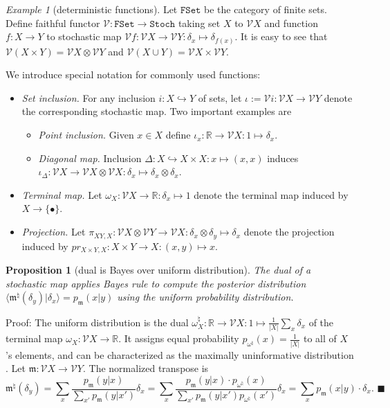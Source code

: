 \documentclass[12pt]{article}
\newcommand{\vecify}{{\mathcal V}}
\newcommand{\scat}{{\mathtt{Stoch}}}
\newcommand{\bra}{{\langle}}
\newcommand{\ket}{{\rangle}}
\newcommand{\bR}{{\mathbb R}}
\newcommand{\fm}{{\mathfrak m}}
\newtheorem{prop}[thm]{Proposition}
\theoremstyle{remark}
\newtheorem{eg}{Example}
\begin{document}
\begin{eg}[deterministic functions]
    \label{eg:det}
	Let $\mathtt{FSet}$ be the category of finite sets. Define faithful 
    functor $\vecify:\mathtt{FSet}\rightarrow \scat$ taking set $X$ to 
    $\vecify X$ and function $f:X\rightarrow Y$ to stochastic map 
    $\vecify f:\vecify X\rightarrow \vecify Y:\delta_x\mapsto 
    \delta_{f(x)}$. It is easy to see that $\vecify(X\times Y)=\vecify 
    X\otimes \vecify Y$ and $\vecify (X\cup Y)=\vecify X\times \vecify Y$.

We introduce special notation for commonly used functions:
\begin{itemize}
	\item \emph{Set inclusion.} 
	For any inclusion $i:X\hookrightarrow Y$ of sets, let $\iota:=\vecify 
    i:\vecify X\rightarrow \vecify Y$ denote the corresponding stochastic 
    map. Two important examples are
	\begin{itemize}
		\item \emph{Point inclusion.} 
		Given $x\in X$ define $\iota_x:\bR\rightarrow \vecify X:1\mapsto 
        \delta_x$.
		\item \emph{Diagonal map.} 
		Inclusion $\Delta:X\hookrightarrow X\times X:x\mapsto(x,x)$ 
        induces $\iota_\Delta:\vecify X\rightarrow \vecify X\otimes 
        \vecify X:\delta_x\mapsto \delta_x\otimes \delta_x$.		
	\end{itemize}
	\item \emph{Terminal map.}
	Let $\omega_X:\vecify X\rightarrow \bR:\delta_x\mapsto 1$ denote the 
    terminal map induced by $X\rightarrow\{\bullet\}$.
	\item \emph{Projection.}
	Let $\pi_{XY,X}:\vecify X\otimes \vecify Y\rightarrow \vecify 
    X:\delta_x\otimes \delta_y\mapsto \delta_x$ denote the projection 
    induced by $pr_{X\times Y,X}:X\times Y\rightarrow X:(x,y)\mapsto x$.
\end{itemize}
\end{eg}

\begin{prop}
	[dual is Bayes over uniform distribution]
	\label{t:dual}
	The dual of a stochastic map applies Bayes rule to compute the 
    posterior distribution $\bra \fm^\natural(\delta_y)|\delta_x\ket=
    p_\fm(x|y)$ using the uniform probability distribution.
\end{prop}

\noindent
Proof: 
The uniform distribution is the dual $\omega_X^\natural:
\bR\rightarrow\vecify X:1\mapsto \frac{1}{|X|}\sum_x \delta_x$ 
of the terminal map $\omega_X:\vecify X\rightarrow \bR$. It assigns 
equal probability $p_{\omega^\natural}(x)=\frac{1}{|X|}$ to all of $X$'s 
elements, and can be characterized as the maximally uninformative 
distribution \cite{jaynes:57}. Let $\fm:\vecify X\rightarrow \vecify Y$. 
The normalized transpose is 
\begin{equation*}
	\fm^\natural(\delta_y)= \sum_x \frac{p_\fm(y|x)}{\sum_{x'}p_\fm(y|x')}
    \delta_x
	= \sum_x \frac{p_\fm(y|x)\cdot p_{\omega^\natural}(x)}
    {\sum_{x'}p_\fm(y|x')p_{\omega^\natural}(x')}\delta_x
	= \sum_x p_\fm(x|y) \cdot \delta_x.
	\,\,\blacksquare
\end{equation*}
\end{document}
